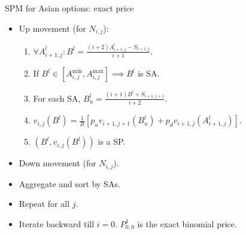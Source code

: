 \documentclass[utf8,t,xcolor=svgnames]{beamer}
\begin{document}
\begin{frame}{SPM for Asian options: exact price}
	\begin{minipage}[t]{0.6\linewidth}
		\begin{itemize}
			\item Up movement (for $ N_{i,j} $):
			\begin{enumerate}
				\item $ \forall A_{i+1,j}^l: B^l = \frac{ ( i+2) A_{i+1,j}^l - S_{i+1,j} }{ i+1 } $.
				\item If $ B^l \in \left[ A_{i,j}^{\min}, A_{i,j}^{\max} \right]  \implies B^l $ is SA.
				\item For each SA, $ B^l_u = \frac{(i+1) B^l + S_{i+1,j+1}}{i+2} $.
				\item $ v_{i,j}( B^l ) = \frac{1}{R} \left[ p_u v_{i+1,j+1} \left( B^l_u \right) + p_d v_{i+1,j} \left( A_{i+1,j}^l \right) \right] $.
				\item $ \left( B^l, v_{i,j}( B^l ) \right) $ is a SP.
			\end{enumerate}
			\item Down movement (for $ N_{i,j} $).
			\item Aggregate and sort by SAs.
			\item Repeat for all $ j $.
			\item Iterate backward till $ i = 0 $. $ P_{0,0}^1 $ is the exact binomial price.
		\end{itemize}

	\end{minipage}
	\begin{minipage}[t]{0.3\linewidth}
		\begin{figure}
		\end{figure}
	\end{minipage}
\end{frame}
\end{document}
